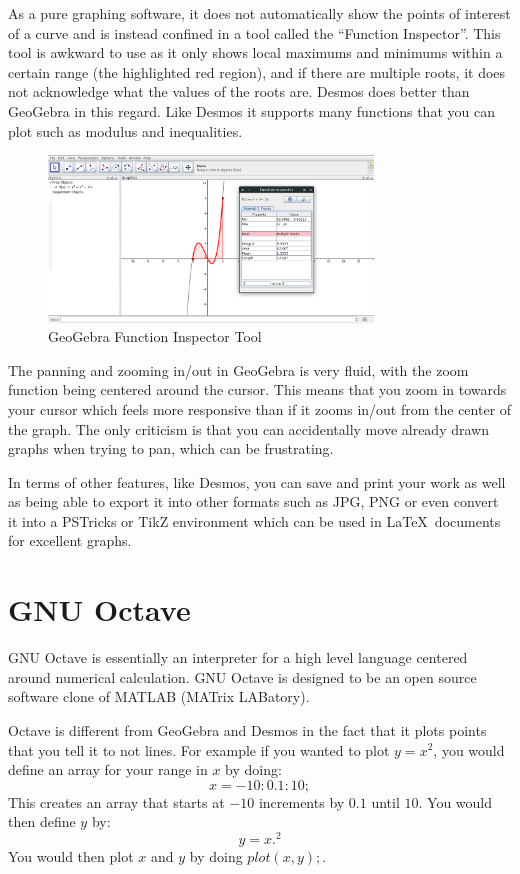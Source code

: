 \documentclass[../../../main.tex]{subfiles}
\begin{document}
As a pure graphing software, it does not automatically show the points of interest of a curve and is instead confined in a tool called the ``Function Inspector''. This tool is awkward to use as it only shows local maximums and minimums within a certain range (the highlighted red region), and if there are multiple roots, it does not acknowledge what the values of the roots are. Desmos does better than GeoGebra in this regard. Like Desmos it supports many functions that you can plot such as modulus and inequalities.
\begin{figure}[H]
	\begin{center}
		\includegraphics[width=0.77\textwidth]{images/geogebraFunc}
	\end{center}
	\caption{GeoGebra Function Inspector Tool}
\end{figure}
The panning and zooming in/out in GeoGebra is very fluid, with the zoom function being centered around the cursor. This means that you zoom in towards your cursor which feels more  responsive than if it zooms in/out from the center of the graph. The only criticism is that you can accidentally move already drawn graphs when trying to pan, which can be frustrating.

In terms of other features, like Desmos, you can save and print your work as well as being able to export it into other formats such as JPG, PNG or even convert it into a PSTricks or TikZ environment which can be used in \LaTeX \ documents for excellent graphs.

\section{GNU Octave}
GNU Octave is essentially an interpreter for a high level language centered around numerical calculation. GNU Octave is designed to be an open source software clone of MATLAB (MATrix LABatory).
\newline

Octave is different from GeoGebra and Desmos in the fact that it plots points that you tell it to not lines. For example if you wanted to plot $y=x^2$, you would define an array for your range in $x$ by doing:
\[x = -10:0.1:10;\]
This creates an array that starts at $-10$ increments by $0.1$ until $10$. You would then define $y$ by:
\[y = x.^2\]
You would then plot $x$ and $y$ by doing $plot(x,y);$.
\end{document}
